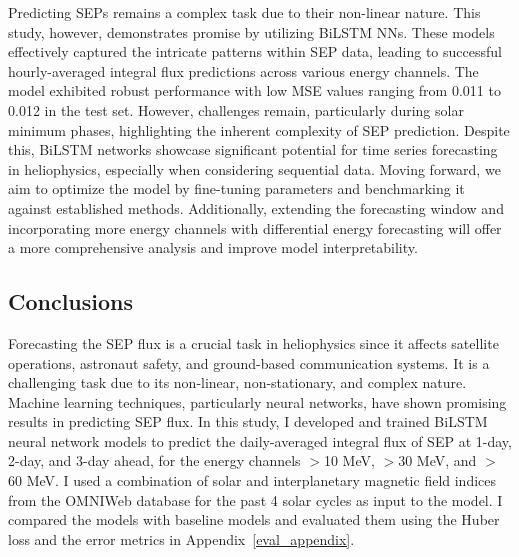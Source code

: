 Predicting SEPs remains a complex task due to their non-linear nature. This study, however, demonstrates promise by utilizing BiLSTM NNs. These models effectively captured the intricate patterns within SEP data, leading to successful hourly-averaged integral flux predictions across various energy channels. The model exhibited robust performance with low MSE values ranging from 0.011 to 0.012 in the test set. However, challenges remain, particularly during solar minimum phases, highlighting the inherent complexity of SEP prediction. Despite this, BiLSTM networks showcase significant potential for time series forecasting in heliophysics, especially when considering sequential data.  Moving forward, we aim to optimize the model by fine-tuning parameters and benchmarking it against established methods. Additionally, extending the forecasting window and incorporating more energy channels with differential energy forecasting will offer a more comprehensive analysis and improve model interpretability.

\subsection{Conclusions}
Forecasting the SEP flux is a crucial task in heliophysics since it affects satellite operations, astronaut safety, and ground-based communication systems. It is a challenging task due to its non-linear, non-stationary, and complex nature. Machine learning techniques, particularly neural networks, have shown promising results in predicting SEP flux.
In this study, I developed and trained BiLSTM neural network models to predict the daily-averaged integral flux of SEP at 1-day, 2-day, and 3-day ahead, for the energy channels $>$10 MeV, $>$30 MeV, and $>$60 MeV.
I used a combination of solar and interplanetary magnetic field indices from the OMNIWeb database for the past 4 solar cycles as input to the model.
I compared the models with baseline models and evaluated them using the Huber loss and the error metrics in Appendix~\ref{eval_appendix}.

